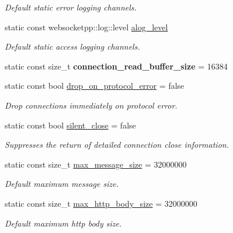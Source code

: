 \begin{DoxyCompactItemize}
\begin{DoxyCompactList}\small\item\em Default static error logging channels. \end{DoxyCompactList}\item 
static const websocketpp\+::log\+::level \mbox{\hyperlink{structwebsocketpp_1_1config_1_1core__client_a286f74bd1d4f4a7c363866ef92284992}{alog\+\_\+level}}
\begin{DoxyCompactList}\small\item\em Default static access logging channels. \end{DoxyCompactList}\item 
\mbox{\label{structwebsocketpp_1_1config_1_1core__client_a74305a56f9b85b51caa9efce0de1766e}} 
static const size\+\_\+t {\bfseries connection\+\_\+read\+\_\+buffer\+\_\+size} = 16384
\item 
static const bool \mbox{\hyperlink{structwebsocketpp_1_1config_1_1core__client_aa43f6d2b983e0d8feb5e0bc1d9ad1be9}{drop\+\_\+on\+\_\+protocol\+\_\+error}} = false
\begin{DoxyCompactList}\small\item\em Drop connections immediately on protocol error. \end{DoxyCompactList}\item 
static const bool \mbox{\hyperlink{structwebsocketpp_1_1config_1_1core__client_affc0279e7717d68fbe5d2bb874f8d4d1}{silent\+\_\+close}} = false
\begin{DoxyCompactList}\small\item\em Suppresses the return of detailed connection close information. \end{DoxyCompactList}\item 
static const size\+\_\+t \mbox{\hyperlink{structwebsocketpp_1_1config_1_1core__client_a84c86d78867a89e10d24866deb931807}{max\+\_\+message\+\_\+size}} = 32000000
\begin{DoxyCompactList}\small\item\em Default maximum message size. \end{DoxyCompactList}\item 
static const size\+\_\+t \mbox{\hyperlink{structwebsocketpp_1_1config_1_1core__client_a4b68db9b245ec097555f7e99842d96b3}{max\+\_\+http\+\_\+body\+\_\+size}} = 32000000
\begin{DoxyCompactList}\small\item\em Default maximum http body size. \end{DoxyCompactList}\item 

\end{DoxyCompactItemize}

